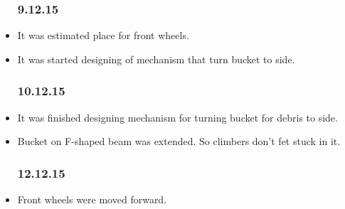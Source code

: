 \begin{itemize}
\subsubsection{9.12.15}

	\item It was estimated place for front wheels.
	
	\item It was started designing of mechanism that turn bucket to side. 

\subsubsection{10.12.15}

	\item It was finished designing mechanism for turning bucket for debris to side.
	
	\item Bucket on F-shaped beam was extended. So climbers don't fet stuck in it.
\subsubsection{12.12.15}
	\item Front wheels were moved forward.
	

\end{itemize}
